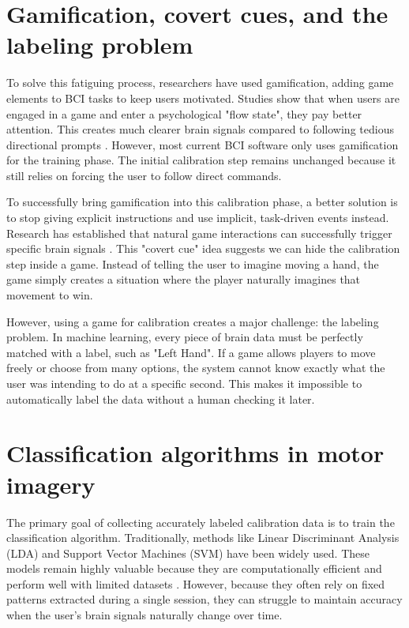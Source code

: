 \documentclass[a4paper, 11pt, openany]{report}
\let\cite\citep
\begin{document}
    \section{Gamification, covert cues, and the labeling problem}
    To solve this fatiguing process, researchers have used gamification, adding game elements to BCI tasks 
    to keep users motivated. Studies show that when users are engaged in a game and enter a psychological 
    "flow state", they pay better attention. This creates much clearer brain signals compared to following 
    tedious directional prompts \cite{skola2019progressive, atilla2024gamification}. However, most current BCI software only uses gamification for the training 
    phase. The initial calibration step remains unchanged because it still relies on forcing the user to 
    follow direct commands.

    To successfully bring gamification into this calibration phase, a better solution is to stop giving 
    explicit instructions and use implicit, task-driven events instead. Research has established that 
    natural game interactions can successfully trigger specific brain signals \cite{vi2012detecting}. This "covert cue" idea 
    suggests we can hide the calibration step inside a game. Instead of telling the user to imagine 
    moving a hand, the game simply creates a situation where the player naturally imagines that movement 
    to win.
    
    However, using a game for calibration creates a major challenge: the labeling problem. In machine 
    learning, every piece of brain data must be perfectly matched with a label, such as "Left Hand". 
    If a game allows players to move freely or choose from many options, the system cannot know exactly 
    what the user was intending to do at a specific second. This makes it impossible to automatically 
    label the data without a human checking it later.

    \section{Classification algorithms in motor imagery}
    The primary goal of collecting accurately labeled calibration data is to train the classification 
    algorithm. Traditionally, methods like Linear Discriminant Analysis (LDA) and Support Vector Machines 
    (SVM) have been widely used. These models remain highly valuable because they are computationally 
    efficient and perform well with limited datasets \cite{blankertz2008optimizing, lotte2018review}. However, because they often rely on fixed patterns 
    extracted during a single session, they can struggle to maintain accuracy when the user's brain signals 
    naturally change over time.
\end{document}

